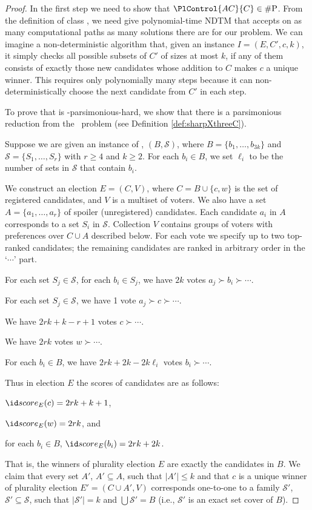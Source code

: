 \begin{proof}
In the first step we need to show that $\PlControl{AC}{C}\in\sharpPclass$.
From the definition of class \sharpPclass, we need give polynomial-time NDTM that accepts on as many computational paths as many solutions there are for our problem.
We can imagine a non-deterministic algorithm that, given an instance $I=(E,C',c,k)$, it simply checks all possible subsets of $C'$ of sizes at most $k$, if any of them consists of exactly those new candidates whose addition to $C$ makes $c$ a unique winner.
This requires only po\-ly\-no\-mial\-ly many steps because it can non-deterministically choose the next candidate from $C'$ in each step.

To prove that  is \sharpPclass-parsimonious-hard, we show that there is a parsimonious reduction from the \sharpXthreeC\ problem (see Definition \ref{def:sharpXthreeC}).

Suppose we are given an instance of \sharpXthreeC, $(B,\mathcal{S})$, where $B=\{b_1,\dots,b_{3k}\}$ and $\mathcal{S}=\{S_1,\dots,S_r\}$ with $r\ge4$ and $k\ge2$.
For each $b_i\in B$, we set $\ell_i$ to be the number of sets in $\mathcal{S}$ that contain $b_i$.

We construct an election $E=(C,V)$, where $C=B\cup\{c,w\}$ is the set of registered candidates, and $V$ is a multiset of voters.
We also have a set $A=\{a_1,\dots,a_r\}$ of spoiler (unregistered) candidates.
Each candidate $a_i$ in $A$ corresponds to a set $S_i$ in $\mathcal{S}$.
Collection $V$ contains groups of voters with preferences over $C\cup A$ described below.
For each vote we specify up to two top-ranked candidates; the remaining candidates are ranked in arbitrary order in the `$\cdots$' part.
\begin{Enumerate}
	\item For each set $S_j\in\mathcal{S}$, for each $b_i\in S_j$, we have $2k$ votes $a_j\succ b_i\succ\cdots$.
	\item For each set $S_j\in\mathcal{S}$, we have 1 vote $a_j\succ c\succ\cdots$.
	\item We have $2rk+k-r+1$ votes $c\succ\cdots$.
	\item We have $2rk$ votes $w\succ\cdots$.
	\item For each $b_i\in B$, we have $2rk+2k-2k\ell_i$ votes $b_i\succ\cdots$.
\end{Enumerate}
Thus in election $E$ the scores of candidates are as follows:
\begin{Enumerate}
	\item $\score{E}(c)=2rk+k+1$,
	\item $\score{E}(w)=2rk$, and
	\item for each $b_i\in B$, $\score{E}(b_i)=2rk+2k$.
\end{Enumerate}
That is, the winners of plurality election $E$ are exactly the candidates in $B$.
We claim that every set $A'$, $A'\subseteq A$, such that $|A'|\le k$ and that $c$ is a unique winner of plurality election $E'=(C\cup A',V)$ corresponds one-to-one to a family $\mathcal{S'}$, $\mathcal{S'}\subseteq\mathcal{S}$, such that $|\mathcal{S'}|=k$ and $\bigcup\mathcal{S'}=B$ (i.e., $\mathcal{S'}$ is an exact set cover of $B$).


\end{proof}
